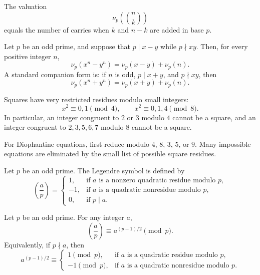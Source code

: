     \begin{theorem}
        The valuation
        \[
            \nu_p\!\left(\binom{n}{k}\right)
        \]
        equals the number of carries when $k$ and $n-k$ are added in base $p$.
    \end{theorem}

    \begin{theorem}
        Let $p$ be an odd prime, and suppose that $p\mid x-y$ while
        $p\nmid xy$. Then, for every positive integer $n$,
        \[
            \nu_p(x^n-y^n)
            =
            \nu_p(x-y)+\nu_p(n).
        \]
        A standard companion form is: if $n$ is odd, $p\mid x+y$, and
        $p\nmid xy$, then
        \[
            \nu_p(x^n+y^n)
            =
            \nu_p(x+y)+\nu_p(n).
        \]
    \end{theorem}

    \begin{fact}
        Squares have very restricted residues modulo small integers:
        \[
            x^2\equiv 0,1\pmod 4,
            \qquad
            x^2\equiv 0,1,4\pmod 8.
        \]
        In particular, an integer congruent to $2$ or $3$ modulo $4$ cannot be a
        square, and an integer congruent to $2,3,5,6,7$ modulo $8$ cannot be a
        square.
    \end{fact}

    \begin{tactic}
        For Diophantine equations, first reduce modulo $4$, $8$, $3$, $5$, or $9$. Many impossible equations are eliminated by
        the small list of possible square residues.
    \end{tactic}

    \begin{definition}
        Let $p$ be an odd prime. The Legendre symbol is defined by
        \[
            \left(\frac{a}{p}\right)
            =
            \begin{cases}
                1, & \text{if }a\text{ is a nonzero quadratic residue modulo }p, \\
                -1, & \text{if }a\text{ is a quadratic nonresidue modulo }p, \\
                0, & \text{if }p\mid a.
            \end{cases}
        \]
    \end{definition}

    \begin{theorem}
        Let $p$ be an odd prime. For any integer $a$,
        \[
            \left(\frac{a}{p}\right)
            \equiv
            a^{(p-1)/2}
            \pmod p.
        \]
        Equivalently, if $p\nmid a$, then
        \[
            a^{(p-1)/2}
            \equiv
            \begin{cases}
                1\pmod p, & \text{if }a\text{ is a quadratic residue modulo }p, \\
                -1\pmod p, & \text{if }a\text{ is a quadratic nonresidue modulo }p.
            \end{cases}
        \]
    \end{theorem}

